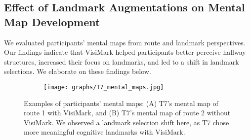 \subsection{Effect of Landmark Augmentations on Mental Map Development}
We evaluated participants' mental maps from route and landmark perspectives. %
Our findings indicate that VisiMark helped participants better perceive hallway structures, increased their focus on landmarks, and led to a shift in landmark selections. We elaborate on these findings below.

\begin{figure*}[ht]
    \centering
    \begin{subfigure}{0.9\textwidth}
        \centering
        \texttt{[image: graphs/T7\_mental\_maps.jpg]}
    \end{subfigure}
    \caption{Examples of participants' mental maps: (A) T7's mental map of route 1 with VisiMark, and (B) T7's mental map of route 2 without VisiMark. We observed a landmark selection shift here, as T7 chose more meaningful cognitive landmarks with VisiMark.}
    \label{fig:mental_maps}
\end{figure*}

